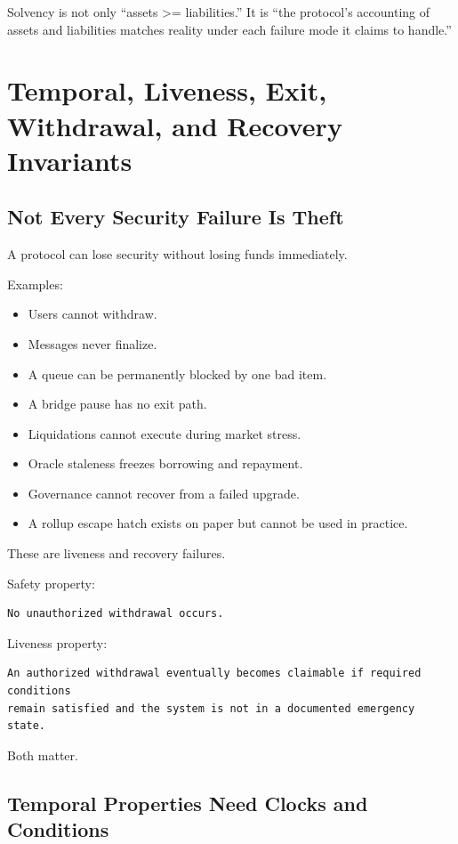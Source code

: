 Solvency is not only ``assets \textgreater= liabilities.'' It is ``the
protocol's accounting of assets and liabilities matches reality under
each failure mode it claims to handle.''

\section{Temporal, Liveness, Exit, Withdrawal, and Recovery Invariants}

\subsection{Not Every Security Failure Is Theft}

A protocol can lose security without losing funds immediately.

Examples:

\begin{itemize}
\tightlist
\item
  Users cannot withdraw.
\item
  Messages never finalize.
\item
  A queue can be permanently blocked by one bad item.
\item
  A bridge pause has no exit path.
\item
  Liquidations cannot execute during market stress.
\item
  Oracle staleness freezes borrowing and repayment.
\item
  Governance cannot recover from a failed upgrade.
\item
  A rollup escape hatch exists on paper but cannot be used in practice.
\end{itemize}

These are liveness and recovery failures.

Safety property:

\begin{lstlisting}
No unauthorized withdrawal occurs.
\end{lstlisting}

Liveness property:

\begin{lstlisting}
An authorized withdrawal eventually becomes claimable if required conditions
remain satisfied and the system is not in a documented emergency state.
\end{lstlisting}

Both matter.

\subsection{Temporal Properties Need Clocks and Conditions}

